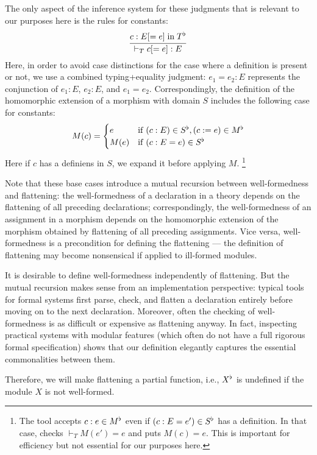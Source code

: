 The only aspect of the inference system for these judgments that is relevant to our purposes here is the rules for constants:
\[\cfrac{c:E[=e] \;\mathrm{in}\; T^\flat}{\vdash_T c[=e]:E}\,\]
Here, in order to avoid case distinctions for the case where a definition is present or not, we use a combined typing+equality judgment: $e_1=e_2:E$ represents the conjunction of $e_1:E$, $e_2:E$, and $e_1=e_2$.
Correspondingly, the definition of the homomorphic extension of a morphism with domain $S$ includes the following case for constants:
\[M(c) = \begin{cases}e&\mathrm{if}\; (c:E) \in S^\flat, (c:=e)\in M^\flat \\ M(e) &\mathrm{if}\; (c:E=e)\in S^\flat\end{cases}\]
Here if $c$ has a definiens in $S$, we expand it before applying $M$.%
\footnote{The \mmt tool accepts $c:e\in M^\flat$ even if $(c:E=e')\in S^\flat$ has a definition. In that case, \mmt checks $\vdash_T M(e')=e$ and puts $M(c)=e$. This is important for efficiency but not essential for our purposes here.}

Note that these base cases introduce a mutual recursion between well-formedness and flattening:
the well-formedness of a declaration in a theory depends on the flattening of all preceding declarations;
correspondingly, the well-formedness of an assignment in a morphism depends on the homomorphic extension of the morphism obtained by flattening of all preceding assignments.
Vice versa, well-formedness is a precondition for defining the flattening --- the definition of flattening may become nonsensical if applied to ill-formed modules.

It is desirable to define well-formedness independently of flattening.
But the mutual recursion makes sense from an implementation perspective: typical tools for formal systems first parse, check, and flatten a declaration entirely before moving on to the next declaration.
Moreover, often the checking of well-formedness is as difficult or expensive as flattening anyway.
In fact, inspecting practical systems with modular features (which often do not have a full rigorous formal specification) shows that our definition elegantly captures the essential commonalities between them.

Therefore, we will make flattening a partial function, i.e., $X^\flat$ is undefined if the module $X$ is not well-formed. 

%

